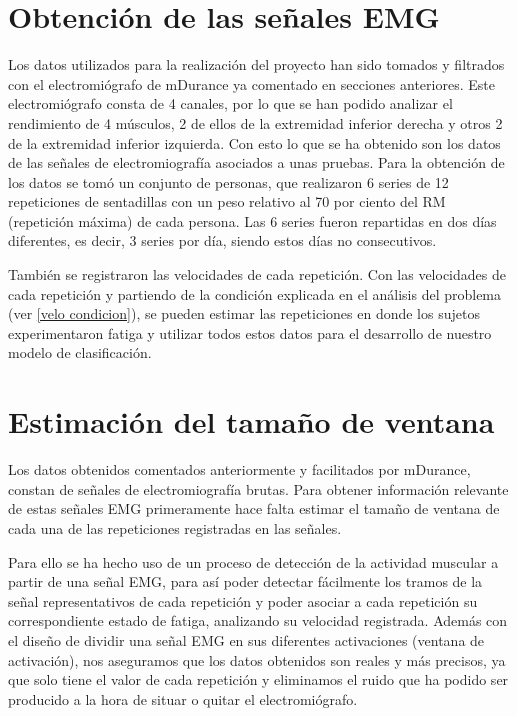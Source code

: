 \newpage   
\section{Obtención de las señales EMG}
Los datos utilizados para la realización del proyecto han sido tomados y filtrados con el electromiógrafo de mDurance ya comentado en secciones anteriores. Este electromiógrafo consta de 4 canales, por lo que se han podido analizar el rendimiento de 4 músculos, 2 de ellos de la extremidad inferior derecha y otros 2 de la extremidad inferior izquierda. Con esto lo que se ha obtenido son los datos de las señales de electromiografía asociados a unas pruebas. Para la obtención de los datos se tomó un conjunto de personas, que realizaron 6 series de 12 repeticiones de sentadillas con un peso relativo al 70 por ciento del RM (repetición máxima) de cada persona. Las 6 series fueron repartidas en dos días diferentes, es decir, 3 series por día, siendo estos días no consecutivos. 

También se registraron las velocidades de cada repetición. Con las velocidades de cada repetición y partiendo de la condición explicada en el análisis del problema (ver \ref{velo condicion}), se pueden estimar las repeticiones en donde los sujetos experimentaron fatiga y utilizar todos estos datos para el desarrollo de nuestro modelo de clasificación.


\section{Estimación del tamaño de ventana}
Los datos obtenidos comentados anteriormente y facilitados por mDurance, constan de señales de electromiografía brutas. Para obtener información relevante de estas señales EMG primeramente hace falta estimar el tamaño de ventana de cada una de las repeticiones registradas en las señales. 

Para ello se ha hecho uso de un proceso de detección de la actividad muscular a partir de una señal EMG, para así poder detectar fácilmente los tramos de la señal representativos de cada repetición y poder asociar a cada repetición su correspondiente estado de fatiga, analizando su velocidad registrada. Además con el diseño de dividir una señal EMG en sus diferentes activaciones (ventana de activación), nos aseguramos que los datos obtenidos son reales y más precisos, ya que solo tiene el valor de cada repetición y eliminamos el ruido que ha podido ser producido a la hora de situar o quitar el electromiógrafo.

